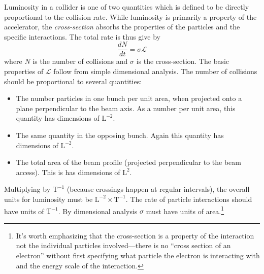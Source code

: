 Luminosity in a collider is one of two quantities which is defined to be directly proportional to the collision rate.
While luminosity is primarily a property of the accelerator, the \emph{cross-section} absorbs the properties of the particles and the specific interactions.
The total rate is thus give by
\begin{equation}
  \frac{d N}{d t} = \sigma \mathcal{L}
  \label{eq:lumi-cross-section}
\end{equation}
where $N$ is the number of collisions and $\sigma$ is the cross-section.
The basic properties of $\mathcal{L}$ follow from simple dimensional analysis.
The number of collisions should be proportional to several quantities:
\begin{itemize}
\item The number particles in one bunch per unit area, when projected onto a plane perpendicular to the beam axis. As a number per unit area, this quantity has dimensions of $\mathrm{L}^{-2}$.
\item The same quantity in the opposing bunch. Again this quantity has dimensions of $\mathrm{L}^{-2}$.
\item The total area of the beam profile (projected perpendicular to the beam access). This is has dimensions of $\mathrm{L}^2$.
\end{itemize}
Multiplying by $\mathrm{T}^{-1}$ (because crossings happen at regular intervals), the overall units for luminosity must be $\mathrm{L}^{-2} \times \mathrm{T}^{-1}$.
The rate of particle interactions should have units of $\mathrm{T}^{-1}$.
By dimensional analysis $\sigma$ must have units of area.\footnote{%
It's worth emphasizing that
the cross-section is a property of the interaction not the individual particles involved---there is no ``cross section of an electron'' without first specifying what particle the electron is interacting with and the energy scale of the interaction.}

